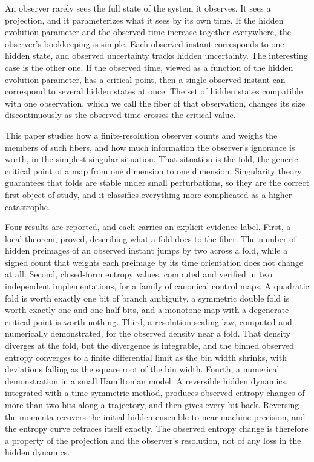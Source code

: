 \documentclass[aps,pre,reprint,nofootinbib]{revtex4-2}
\begin{document}
An observer rarely sees the full state of the system it observes.  It sees a
projection, and it parameterizes what it sees by its own time.  If the hidden
evolution parameter and the observed time increase together everywhere, the
observer's bookkeeping is simple.  Each observed instant corresponds to one
hidden state, and observed uncertainty tracks hidden uncertainty.  The
interesting case is the other one.  If the observed time, viewed as a
function of the hidden evolution parameter, has a critical point, then a
single observed instant can correspond to several hidden states at once.
The set of hidden states compatible with one observation, which we call the
fiber of that observation, changes its size discontinuously as the observed
time crosses the critical value.

This paper studies how a finite-resolution observer counts and weighs the
members of such fibers, and how much information the observer's ignorance is
worth, in the simplest singular situation.  That situation is the fold, the
generic critical point of a map from one dimension to one dimension.
Singularity theory guarantees that folds are stable under small
perturbations, so they are the correct first object of study, and it
classifies everything more complicated as a higher catastrophe.

Four results are reported, and each carries an explicit evidence label.
First, a local theorem, proved, describing what a fold does to the fiber.
The number of hidden preimages of an observed instant jumps by two across a
fold, while a signed count that weights each preimage by its time
orientation does not change at all.  Second, closed-form entropy values,
computed and verified in two independent implementations, for a family of
canonical control maps.  A quadratic fold is worth exactly one bit of branch
ambiguity, a symmetric double fold is worth exactly one and one half bits,
and a monotone map with a degenerate critical point is worth nothing.
Third, a resolution-scaling law, computed and numerically demonstrated, for
the observed density near a fold.  That density diverges at the fold, but
the divergence is integrable, and the binned observed entropy converges to a
finite differential limit as the bin width shrinks, with deviations falling
as the square root of the bin width.  Fourth, a numerical demonstration in a
small Hamiltonian model.  A reversible hidden dynamics, integrated with a
time-symmetric method, produces observed entropy changes of more than two
bits along a trajectory, and then gives every bit back.  Reversing the
momenta recovers the initial hidden ensemble to near machine precision, and
the entropy curve retraces itself exactly.  The observed entropy change is
therefore a property of the projection and the observer's resolution, not of
any loss in the hidden dynamics.
\end{document}
